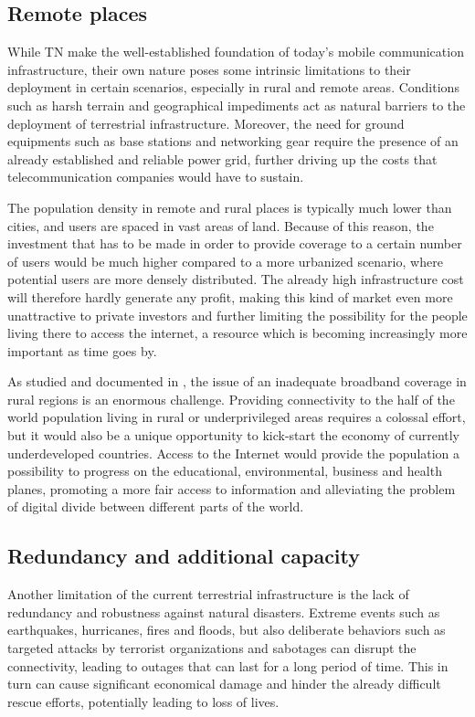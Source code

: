 \subsection{Remote places}
While \ac{TN} make the well-established foundation of today’s mobile communication infrastructure, their own nature poses some intrinsic limitations to their deployment in certain scenarios, especially in rural and remote areas. Conditions such as harsh terrain and geographical impediments act as natural barriers to the deployment of terrestrial infrastructure. Moreover, the need for ground equipments such as base stations and networking gear require the presence of an already established and reliable power grid, further driving up the costs that telecommunication companies would have to sustain.

The population density in remote and rural places is typically much lower than cities, and users are spaced in vast areas of land. Because of this reason, the investment that has to be made in order to provide coverage to a certain number of users would be much higher compared to a more urbanized scenario, where potential users are more densely distributed. The already high infrastructure cost will therefore hardly generate any profit, making this kind of market even more unattractive to private investors and further limiting the possibility for the people living there to access the internet, a resource which is becoming increasingly more important as time goes by.

As studied and documented in \cite{6g-challenge-opportunity-base-pyramid}, the issue of an inadequate broadband coverage in rural regions is an enormous challenge. Providing connectivity to the half of the world population living in rural or underprivileged areas requires a colossal effort, but it would also be a unique opportunity to kick-start the economy of currently underdeveloped countries. Access to the Internet would provide the population a possibility to progress on the educational, environmental, business and health planes, promoting a more fair access to information and alleviating the problem of digital divide between different parts of the world.

\subsection{Redundancy and additional capacity}
Another limitation of the current terrestrial infrastructure is the lack of redundancy and robustness against natural disasters. Extreme events such as earthquakes, hurricanes, fires and floods, but also deliberate behaviors such as targeted attacks by terrorist organizations and sabotages can disrupt the connectivity, leading to outages that can last for a long period of time. This in turn can cause significant economical damage and hinder the already difficult rescue efforts, potentially leading to loss of lives.

